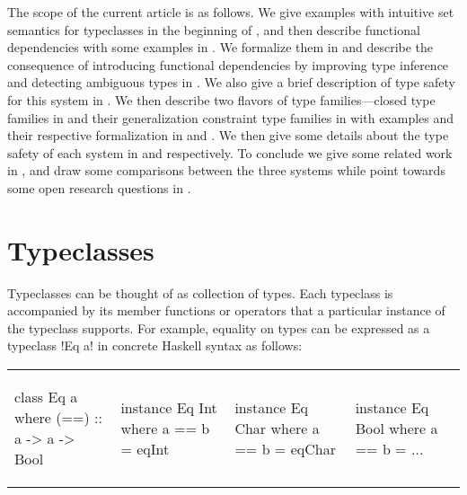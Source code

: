 \documentclass[format=sigplan,manuscript,review,screen,nonacm,margin=1in]{acmart}
\begin{document}
The scope of the current article is as follows.
We give examples with intuitive set semantics for typeclasses in the beginning of ,
and then describe functional dependencies\cite{jones_tcfd_2000} with some examples in .
We formalize them in  and describe the consequence of introducing
functional dependencies by improving type inference and detecting ambiguous types in .
We also give a brief description of type safety for this system in .
We then describe two flavors of type families---closed type families\cite{eisenberg_typefamilies_2014}
in  and their generalization constraint type families\cite{morris_typefamilies_2017}
in  with examples and their respective formalization in 
and . We then give some details about the type safety of
each system in  and  respectively.
To conclude we give some related work in , and draw some comparisons
between the three systems while point towards some open research questions in .

\section{Typeclasses}\label{sec:tc}
Typeclasses can be thought of as collection of types. Each typeclass is accompanied by its member
functions or operators that a particular instance of the typeclass supports. For example,
equality on types can be expressed as a typeclass !Eq a! in concrete Haskell syntax as follows:\newline
\begin{tabular}{l l l l}
\begin{code}
class Eq a where
  (==) :: a -> a -> Bool
\end{code}&%
\begin{code}
instance Eq Int where
  a == b = eqInt
\end{code}&%
\begin{code}
instance Eq Char where
  a == b = eqChar
\end{code}&%
\begin{code}
instance Eq Bool where
 a == b = $\ldots$
\end{code}
\end{tabular}
\end{document}
